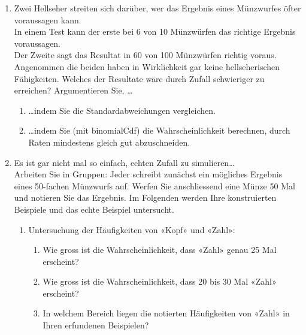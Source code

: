 \begin{ueb}
\begin{enumerate}
        \item Zwei Hellseher streiten sich darüber, wer das Ergebnis eines Münzwurfes öfter voraussagen kann. \\
              In einem Test kann der erste bei 6 von 10 Münzwürfen das richtige Ergebnis voraussagen. \\
              Der Zweite sagt das Resultat in 60 von 100 Münzwürfen richtig voraus. \\
              Angenommen die beiden haben in Wirklichkeit gar keine hellseherischen Fähigkeiten. Welches der Resultate wäre durch Zufall schwieriger zu erreichen? Argumentieren Sie, \dots
              \begin{enumerate}
                  \item \dots indem Sie die Standardabweichungen vergleichen.
                  \item \dots indem Sie (mit binomialCdf) die Wahrscheinlichkeit berechnen, durch Raten mindestens gleich gut abzuschneiden.
              \end{enumerate}

        \item Es ist gar nicht mal so einfach, echten Zufall zu simulieren\dots \\
              Arbeiten Sie in Gruppen: Jeder schreibt zunächst ein mögliches Ergebnis eines 50-fachen Münzwurfs auf. Werfen Sie anschliessend eine Münze 50 Mal und notieren Sie das Ergebnis.
              Im Folgenden werden Ihre konstruierten Beispiele und das echte Beispiel untersucht.

              \begin{enumerate}
                  \item Untersuchung der Häufigkeiten von «Kopf» und «Zahl»:
                        \begin{enumerate}
                            \item Wie gross ist die Wahrscheinlichkeit, dass «Zahl» genau 25 Mal erscheint?
                            \item Wie gross ist die Wahrscheinlichkeit, dass 20 bis 30 Mal «Zahl» erscheint?
                            \item In welchem Bereich liegen die notierten Häufigkeiten von «Zahl» in Ihren erfundenen Beispielen?
                        \end{enumerate}


\end{enumerate}
\end{enumerate}
\end{ueb}
